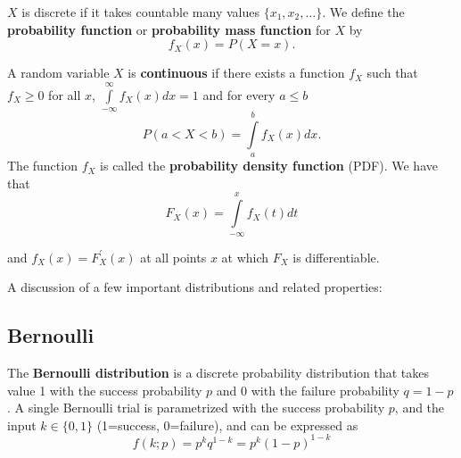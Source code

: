 \begin{definition}
$X$ is discrete if it takes countable many values $\{x_{1},x_{2},\ldots\}$. We define the {\bf probability function} or {\bf probability mass function} for $X$ by
\begin{equation*}
	f_{X}(x)= P (X=x).
\end{equation*}
\end{definition}


\fbox
{\begin{minipage}[h]{0.9\linewidth} 
\begin{definition}
A random variable $X$ is {\bf continuous} if there exists a function $f_{X}$ such that $f_{X} \geq 0$ for all $x$, $\int\limits_{-\infty}^{\infty} f_{X}(x)dx = 1$ and for every $a\leq b$
\begin{equation}
P(a < X < b) = \int\limits_{a}^{b}f_{X}(x)dx.
\end{equation}
The function $f_{X}$ is called the {\bf probability density function} (PDF). We have that
\begin{equation*}
F_{X}(x) = \int\limits_{-\infty}^{x}f_{X}(t)dt
\end{equation*}

and $f_{X}(x)=F_{X}^{'}(x)$ at all points $x$ at which $F_{X}$ is differentiable.
\end{definition}
\end{minipage}}


\vspace{0.1in}
A discussion of a few important distributions and related properties:

\subsection{\label{bernoulli} Bernoulli}
The {\bf Bernoulli distribution} is a discrete probability distribution that takes value 1 with the success probability $p$ and 0 with the failure probability $q=1-p$. A single Bernoulli trial is parametrized with the success probability $p$, and the input $k\in \{0,1\}$ (1=success, 0=failure), and can be expressed as
\begin{equation*}
\label{bernoulli-eq}
f(k;p) = p^kq^{1-k} = p^k(1-p)^{1-k}
\end{equation*}

